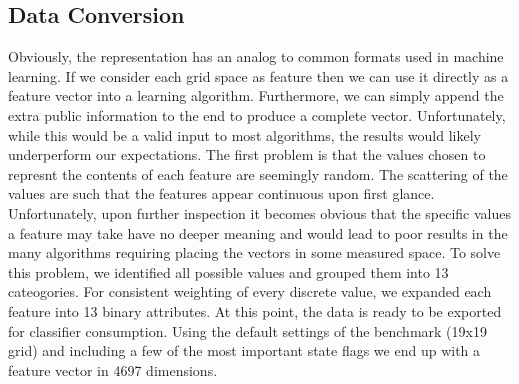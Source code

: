 \documentclass[]{article}   %
\begin{document}
\subsection{Data Conversion}
Obviously, the representation has an analog to common formats used in machine learning.  If we consider each grid space as feature then we can use it directly as a feature vector into a learning algorithm.  Furthermore, we can simply append the extra public information to the end to produce a complete vector.  Unfortunately, while this would be a valid input to most algorithms, the results would likely underperform our expectations.
\newline\newline
The first problem is that the values chosen to represnt the contents of each feature are seemingly random.  The scattering of the values are such that the features appear continuous upon first glance.  Unfortunately, upon further inspection it becomes obvious that the specific values a feature may take have no deeper meaning and would lead to poor results in the many algorithms requiring placing the vectors in some measured space.  To solve this problem, we identified all possible values and grouped them into 13 cateogories.  For consistent weighting of every discrete value, we expanded each feature into 13 binary attributes.  At this point, the data is ready to be exported for classifier consumption.  Using the default settings of the benchmark (19x19 grid) and including a few of the most important state flags we end up with a feature vector in 4697 dimensions.
\end{document}
